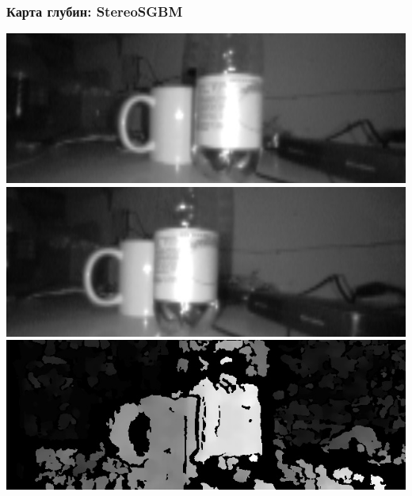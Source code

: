 \documentclass{beamer}
\begin{document}
		\begin{frame}
		    \frametitle{Карта глубин: StereoSGBM}
		   
		    \begin{center}
		    \includegraphics[scale=0.45]{images/rectL}
				\includegraphics[scale=0.45]{images/rectR}
				\newline\newline
				\includegraphics[scale=0.7]{images/disp}
			\end{center}
		\end{frame}
		
\end{document}
